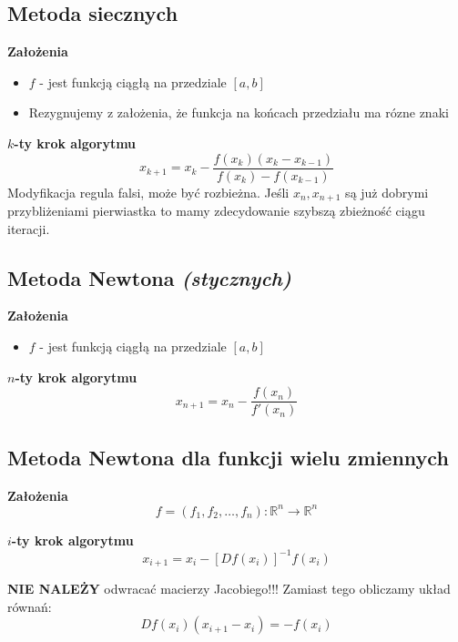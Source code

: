 \documentclass[../mn-notatki.tex]{subfiles}
\begin{document}
\subsection{Metoda siecznych}

\begin{tcolorbox}
\textbf{Założenia}
\begin{itemize}
    \item $f$ - jest funkcją ciągłą na przedziale $[a,b]$
    \item Rezygnujemy z założenia, że funkcja na końcach przedziału ma rózne znaki\\
\end{itemize}

\textbf{$k$-ty krok algorytmu}
\[
x_{k+1} = x_k - \frac{f(x_k)(x_k - x_{k-1})}{f(x_k) - f(x_{k-1})}
\]
Modyfikacja regula falsi, może być rozbieżna. Jeśli $x_n, x_{n+1}$ są już
dobrymi przybliżeniami pierwiastka to mamy zdecydowanie szybszą zbieżność ciągu
iteracji.
\end{tcolorbox}

\subsection{Metoda Newtona \textit{(stycznych)}}

\begin{tcolorbox}
\textbf{Założenia}
\begin{itemize}
    \item $f$ - jest funkcją ciągłą na przedziale $[a,b]$
\end{itemize}

\textbf{$n$-ty krok algorytmu}
\[
x_{n+1} = x_n - \frac{f(x_n)}{f'(x_n)}
\]
\end{tcolorbox}


\subsection{Metoda Newtona dla funkcji wielu zmiennych}

\begin{tcolorbox}
\textbf{Założenia}
\[
f = (f_1, f_2, \ldots, f_n) : \mathbb{R}^n \rightarrow \mathbb{R}^n
\]

\textbf{$i$-ty krok algorytmu}
\[
x_{i+1} = x_i - \left[ D f(x_i) \right]^{-1} f(x_i)
\]

\textbf{NIE NALEŻY} odwracać macierzy Jacobiego!!!
Zamiast tego obliczamy układ równań:
\[
D f(x_i) (x_{i+1} - x_i) = -f(x_i)
\]
\end{tcolorbox}
\end{document}
